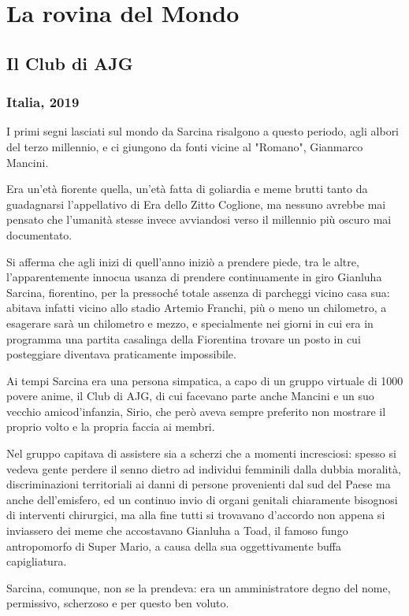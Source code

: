 \chapter{La rovina del Mondo}
\section{Il Club di AJG}
	\subsection*{Italia, 2019}

I primi segni lasciati sul mondo da Sarcina risalgono a questo periodo, agli albori del terzo millennio, e ci giungono da fonti vicine al "Romano", Gianmarco Mancini.

Era un'età fiorente quella, un'età fatta di goliardia e meme brutti tanto da guadagnarsi l'appellativo di Era dello Zitto Coglione, ma nessuno avrebbe mai pensato che l’umanità stesse invece avviandosi verso il millennio più oscuro mai documentato.

Si afferma che agli inizi di quell'anno iniziò a prendere piede, tra le altre, l'apparentemente innocua usanza di prendere continuamente in giro Gianluha Sarcina, fiorentino, per la pressoché totale assenza di parcheggi vicino casa sua: abitava infatti vicino allo stadio Artemio Franchi, più o meno un chilometro, a esagerare sarà un chilometro e mezzo, e specialmente nei giorni in cui era in programma una partita casalinga della Fiorentina trovare un posto in cui posteggiare diventava praticamente impossibile.

Ai tempi Sarcina era una persona simpatica, a capo di un gruppo virtuale di 1000 povere anime, il Club di AJG, di cui facevano parte anche Mancini e un suo vecchio amicod'infanzia, Sirio, che però aveva sempre preferito non mostrare il proprio volto e la propria faccia ai membri.

Nel gruppo capitava di assistere sia a scherzi che a momenti incresciosi: spesso si vedeva gente perdere il senno dietro ad individui femminili dalla dubbia moralità, discriminazioni territoriali ai danni di persone provenienti dal sud del Paese ma anche dell'emisfero, ed un continuo invio di organi genitali chiaramente bisognosi di interventi chirurgici, ma alla fine tutti si trovavano d'accordo non appena si inviassero dei meme che accostavano Gianluha a Toad, il famoso fungo antropomorfo di Super Mario, a causa della sua oggettivamente buffa capigliatura.

Sarcina, comunque, non se la prendeva: era un amministratore degno del nome, permissivo, scherzoso e per questo ben voluto.


